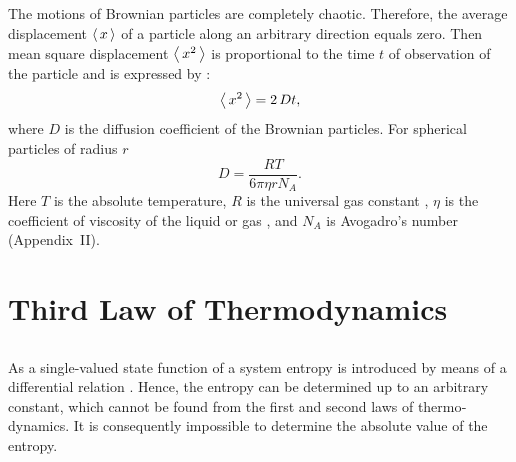 \subsection{}\label{11.7.4} The motions of Brownian particles are completely chao­tic. Therefore, the average displacement $\expval{\, x \,}$ of a particle along an arbitrary direction equals zero. Then mean square displacement $\expval{\, x^{2} \,}$ is proportional to the time $t$ of observation of the particle and is expressed by :
\begin{equation*}
\expval{\, x^{2} \,} = 2 \,D t,
\end{equation*}
where $D$ is the diffusion coefficient of the Brownian particles. For spherical particles of radius $r$
\begin{equation*}
D = \frac{RT}{6 \pi \eta r N_{A}}.
\end{equation*}
Here $T$ is the absolute temperature, $R$ is the universal gas con­stant , $\eta$ is the coefficient of viscosity of the liquid or gas , and $N_{A}$ is Avogadro's number (Appendix~II).

\section{Third Law of Thermodynamics}
\label{sec-11.8}
 
\subsection{}\label{11.8.1} As a single-valued state function of a system entropy is introduced by means of a differential relation . Hence, the entropy can be determined up to an arbitrary constant, which cannot be found from the first and second laws of thermo­ dynamics. It is consequently impossible to determine the absolute value of the entropy.

